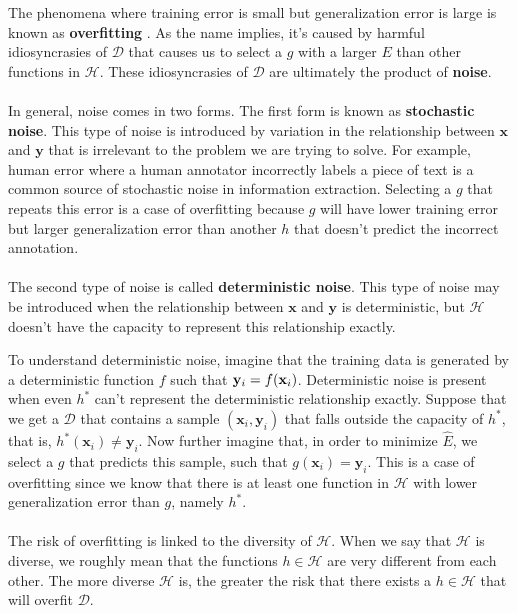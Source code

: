 The phenomena where training error is small but generalization error is large is known as \textbf{overfitting} \citep{yaser12}. As the name implies, it's caused by harmful idiosyncrasies of $\mathcal{D}$ that causes us to select a $g$ with a larger $E$ than other functions in $\mathcal{H}$. These idiosyncrasies of $\mathcal{D}$ are ultimately the product of \textbf{noise}.
\\\\
In general, noise comes in two forms. The first form is known as \textbf{stochastic noise}. This type of noise is introduced by variation in the relationship between $\mathbf{x}$ and $\mathbf{y}$ that is irrelevant to the problem we are trying to solve. For example, human error where a human annotator incorrectly labels a piece of text is a common source of stochastic noise in information extraction. Selecting a $g$ that repeats this error is a case of overfitting because $g$ will have lower training error but larger generalization error than another $h$ that doesn't predict the incorrect annotation.
\\\\
The second type of noise is called \textbf{deterministic noise}. This type of noise may be introduced when the relationship between $\mathbf{x}$ and $\mathbf{y}$ is deterministic, but $\mathcal{H}$ doesn't have the capacity to represent this relationship exactly.

To understand deterministic noise, imagine that the training data is generated by a deterministic function $f$ such that $\mathbf{y}_i = f(\mathbf{x}_i)$. Deterministic noise is present when even $h^*$ can't represent the deterministic relationship exactly. Suppose that we get a $\mathcal{D}$ that contains a sample $(\mathbf{x}_i, \mathbf{y}_i)$ that falls outside the capacity of $h^*$, that is, $h^*(\mathbf{x}_i) \neq \mathbf{y}_i$. Now further imagine that, in order to minimize $\hat{E}$, we select a $g$ that predicts this sample, such that $g(\mathbf{x}_i) = \mathbf{y}_i$. This is a case of overfitting since we know that there is at least one function in $\mathcal{H}$ with lower generalization error than $g$, namely $h^*$.
\\\\
The risk of overfitting is linked to the diversity of $\mathcal{H}$. When we say that $\mathcal{H}$ is diverse, we roughly mean that the functions $h \in \mathcal{H}$ are very different from each other. The more diverse $\mathcal{H}$ is, the greater the risk that there exists a $h \in \mathcal{H}$ that will overfit $\mathcal{D}$.

